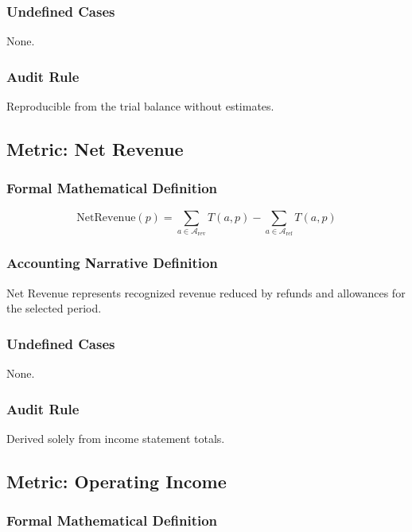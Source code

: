 \documentclass[11pt]{article}
\newcommand{\AccountSet}[1]{\mathcal{A}_{\text{#1}}}
\newcommand{\Total}{T}
\newcommand{\Period}{p}
\begin{document}
\subsubsection*{Undefined Cases}
None.

\subsubsection*{Audit Rule}
Reproducible from the trial balance without estimates.

\subsection{Metric: Net Revenue}

\subsubsection*{Formal Mathematical Definition}
\[
\text{NetRevenue}(\Period)
= \sum_{a \in \AccountSet{rev}} \Total(a, \Period)
- \sum_{a \in \AccountSet{ref}} \Total(a, \Period)
\]

\subsubsection*{Accounting Narrative Definition}
Net Revenue represents recognized revenue reduced by refunds and
allowances for the selected period.

\subsubsection*{Undefined Cases}
None.

\subsubsection*{Audit Rule}
Derived solely from income statement totals.

\subsection{Metric: Operating Income}

\subsubsection*{Formal Mathematical Definition}
\end{document}
